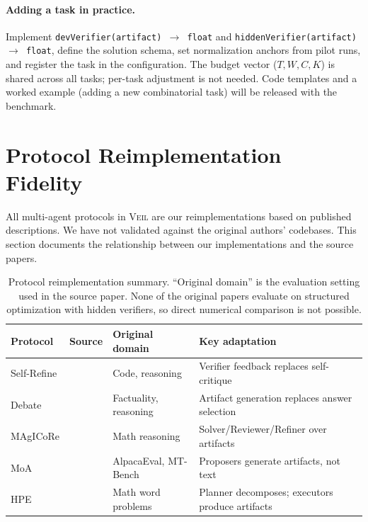 \documentclass{article}
\begin{document}
\paragraph{Adding a task in practice.}
Implement \texttt{devVerifier(artifact) $\to$ float} and \texttt{hiddenVerifier(artifact) $\to$ float}, define the solution schema, set normalization anchors from pilot runs, and register the task in the configuration. The budget vector ($T, W, C, K$) is shared across all tasks; per-task adjustment is not needed. Code templates and a worked example (adding a new combinatorial task) will be released with the benchmark.

\section{Protocol Reimplementation Fidelity}
\label{app:reimplementation}

All multi-agent protocols in \textsc{Veil} are our reimplementations based on published descriptions. We have not validated against the original authors' codebases. This section documents the relationship between our implementations and the source papers.

\begin{table}[h]
\caption{Protocol reimplementation summary. ``Original domain'' is the evaluation setting used in the source paper. None of the original papers evaluate on structured optimization with hidden verifiers, so direct numerical comparison is not possible.}
\label{tab:reimplementation}
\centering
\small
\begin{tabular}{l l l l}
\toprule
Protocol & Source & Original domain & Key adaptation \\
\midrule
Self-Refine & \citet{madaan2023selfrefine} & Code, reasoning & Verifier feedback replaces self-critique \\
Debate & \citet{du2024debate} & Factuality, reasoning & Artifact generation replaces answer selection \\
MAgICoRe & \citet{chen2025magicore} & Math reasoning & Solver/Reviewer/Refiner over artifacts \\
MoA & \citet{wang2025moa} & AlpacaEval, MT-Bench & Proposers generate artifacts, not text \\
HPE & \citet{wang2023plansolve} & Math word problems & Planner decomposes; executors produce artifacts \\
\bottomrule
\end{tabular}
\end{table}
\end{document}

